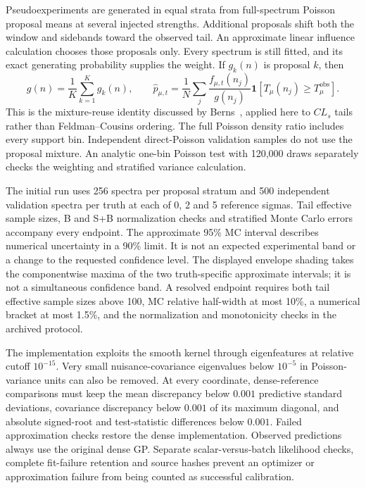 Pseudoexperiments are generated in equal strata from full-spectrum Poisson
proposal means at several injected strengths. Additional proposals shift
both the window and sidebands toward the observed tail. An approximate
linear influence calculation chooses those proposals only. Every spectrum
is still fitted, and its exact generating probability supplies the weight.
If $g_k(n)$ is proposal $k$, then
\begin{equation}
 g(n)=\frac{1}{K}\sum_{k=1}^K g_k(n),\qquad
 \widehat p_{\mu,t}=\frac{1}{N}\sum_j
 \frac{f_{\mu,t}(n_j)}{g(n_j)}
 \mathbf{1}[T_\mu(n_j)\ge T_\mu^{\mathrm{obs}}].
\end{equation}
This is the mixture-reuse identity discussed by Berns~\cite{berns}, applied
here to $CL_s$ tails rather than Feldman--Cousins ordering. The full Poisson
density ratio includes every support bin. Independent direct-Poisson
validation samples do not use the proposal mixture. An analytic one-bin
Poisson test with 120,000 draws separately checks the weighting and
stratified variance calculation.

The initial run uses 256 spectra per proposal stratum and 500 independent
validation spectra per truth at each of 0, 2 and 5 reference sigmas. Tail
effective sample sizes, B and S+B normalization checks and stratified
Monte Carlo errors accompany every endpoint. The approximate 95\% MC
interval describes numerical uncertainty in a 90\% limit. It is not an
expected experimental band or a change to the requested confidence level.
The displayed envelope shading takes the componentwise maxima of the two
truth-specific approximate intervals; it is not a simultaneous confidence band.
A resolved endpoint requires both tail effective sample sizes above 100,
MC relative half-width at most 10\%, a numerical bracket at most 1.5\%,
and the normalization and monotonicity checks in the archived protocol.

The implementation exploits the smooth kernel through eigenfeatures at
relative cutoff $10^{-15}$. Very small nuisance-covariance eigenvalues
below $10^{-5}$ in Poisson-variance units can also be removed. At every
coordinate, dense-reference comparisons must keep the mean discrepancy
below $0.001$ predictive standard deviations, covariance discrepancy below
$0.001$ of its maximum diagonal, and absolute signed-root and test-statistic
differences below $0.001$. Failed approximation checks restore the dense
implementation. Observed predictions always use the original dense GP.
Separate scalar-versus-batch likelihood checks, complete fit-failure
retention and source hashes prevent an optimizer or approximation failure
from being counted as successful calibration.

